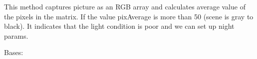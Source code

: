 \documentclass[letterpaper,10pt,english,openany]{sphinxmanual}
\begin{document}
\begin{fulllineitems}
\begin{fulllineitems}
\begin{description}
\end{description}

\end{fulllineitems}


\begin{fulllineitems}
\label{index:rpicameramon.motion.CaptureHandler.scan_day}
This method captures picture as an RGB array and calculates
average value of the pixels in the matrix.
If the value pixAverage is more than 50 (scene is gray to black).
It indicates that the light condition is poor and we can set up night
params.

\end{fulllineitems}


\end{fulllineitems}


\begin{fulllineitems}
\label{index:rpicameramon.motion.SMSHandler}
Bases: 

\begin{fulllineitems}
\label{index:rpicameramon.motion.SMSHandler.handle_sms}
\end{fulllineitems}


\end{fulllineitems}

\end{document}
